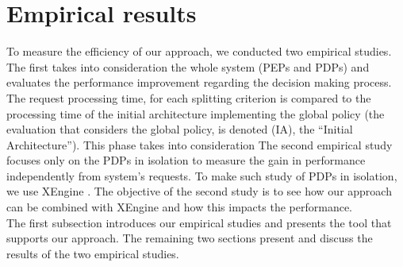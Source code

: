 


\section{Empirical results} \label{sec:experiment}

To measure the efficiency of our approach, we conducted two empirical studies. The first takes into consideration the whole system 
(PEPs and PDPs) and evaluates the performance improvement regarding the decision making process. The request processing time, 
for each splitting criterion is compared to the processing time of the initial architecture implementing the global policy (the evaluation 
that considers the global policy, is denoted (IA), the ``Initial Architecture''). This phase takes into consideration The second empirical study focuses only on the PDPs in isolation to measure the gain in performance
 independently from system's requests. To make such study of PDPs in isolation, we use XEngine \cite{Xengine}. The objective of the second study is to see how our approach can be combined 
with XEngine and how this impacts the performance.
\\
The first subsection introduces our empirical studies and presents the tool that supports our approach. The remaining two sections present and discuss the results of the two empirical studies.  

